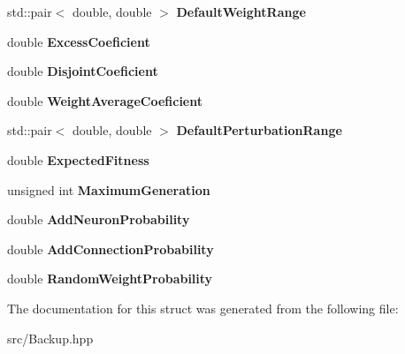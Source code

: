 \begin{DoxyCompactItemize}
\item 
\mbox{\label{struct_indie_neat_1_1_backup_1_1_params_a67d9292ea9e640a5729fe5d631685089}} 
std\+::pair$<$ double, double $>$ {\bfseries Default\+Weight\+Range}
\item 
\mbox{\label{struct_indie_neat_1_1_backup_1_1_params_a1e6a5e73cbc492081f36b0896e9bf093}} 
double {\bfseries Excess\+Coeficient}
\item 
\mbox{\label{struct_indie_neat_1_1_backup_1_1_params_a50e77dabfd18313b2586fe619824f8fe}} 
double {\bfseries Disjoint\+Coeficient}
\item 
\mbox{\label{struct_indie_neat_1_1_backup_1_1_params_a8215ecb87dd748332639c916f21043c2}} 
double {\bfseries Weight\+Average\+Coeficient}
\item 
\mbox{\label{struct_indie_neat_1_1_backup_1_1_params_adf6978ca30f0912f9edaeb84f5c24c0b}} 
std\+::pair$<$ double, double $>$ {\bfseries Default\+Perturbation\+Range}
\item 
\mbox{\label{struct_indie_neat_1_1_backup_1_1_params_ad0ef3e3b83aad87c007a1fee6953b5b8}} 
double {\bfseries Expected\+Fitness}
\item 
\mbox{\label{struct_indie_neat_1_1_backup_1_1_params_af96da1ac4c8da9d7899e92bfb67b6591}} 
unsigned int {\bfseries Maximum\+Generation}
\item 
\mbox{\label{struct_indie_neat_1_1_backup_1_1_params_a2a0881115e1ea4485bc2f4b5d9898174}} 
double {\bfseries Add\+Neuron\+Probability}
\item 
\mbox{\label{struct_indie_neat_1_1_backup_1_1_params_ab0af28fee860496a83b56597dc4dac1d}} 
double {\bfseries Add\+Connection\+Probability}
\item 
\mbox{\label{struct_indie_neat_1_1_backup_1_1_params_a93e861ef6f03ce10b529c377eb832ec5}} 
double {\bfseries Random\+Weight\+Probability}
\end{DoxyCompactItemize}


The documentation for this struct was generated from the following file\+:\begin{DoxyCompactItemize}
\item 
src/Backup.\+hpp\end{DoxyCompactItemize}
